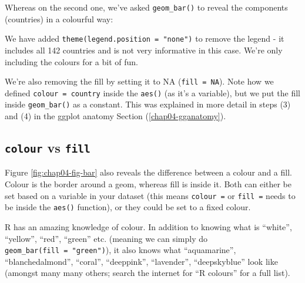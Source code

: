 \documentclass[
  12pt,
  krantz2]{krantz}
\makeatletter
\newenvironment{Shaded}{\begin{snugshade}}{\end{snugshade}}
\newcommand{\DataTypeTok}[1]{\textcolor[rgb]{0.13,0.29,0.53}{#1}}
\newcommand{\KeywordTok}[1]{\textcolor[rgb]{0.13,0.29,0.53}{\textbf{#1}}}
\newcommand{\NormalTok}[1]{#1}
\newcommand{\OperatorTok}[1]{\textcolor[rgb]{0.81,0.36,0.00}{\textbf{#1}}}
\newcommand{\OtherTok}[1]{\textcolor[rgb]{0.56,0.35,0.01}{#1}}
\newcommand{\StringTok}[1]{\textcolor[rgb]{0.31,0.60,0.02}{#1}}
\newenvironment{kframe}{%
\medskip{}
\setlength{\fboxsep}{.8em}
 \def\at@end@of@kframe{}%
 \ifinner\ifhmode%
  \def\at@end@of@kframe{\end{minipage}}%
  \begin{minipage}{\columnwidth}%
 \fi\fi%
 \def\FrameCommand##1{\hskip\@totalleftmargin \hskip-\fboxsep
 \colorbox{shadecolor}{##1}\hskip-\fboxsep
     \hskip-\linewidth \hskip-\@totalleftmargin \hskip\columnwidth}%
 \MakeFramed {\advance\hsize-\width
   \@totalleftmargin\z@ \linewidth\hsize
   \@setminipage}}%
 {\par\unskip\endMakeFramed%
 \at@end@of@kframe}
\renewenvironment{Shaded}{\begin{kframe}}{\end{kframe}}
\makeatother
\begin{document}
Whereas on the second one, we've asked \texttt{geom\_bar()} to reveal the components (countries) in a colourful way:

\begin{Shaded}
\end{Shaded}

We have added \texttt{theme(legend.position\ =\ "none")} to remove the legend - it includes all 142 countries and is not very informative in this case.
We're only including the colours for a bit of fun.

We're also removing the fill by setting it to NA (\texttt{fill\ =\ NA}).
Note how we defined \texttt{colour\ =\ country} inside the \texttt{aes()} (as it's a variable), but we put the fill inside \texttt{geom\_bar()} as a constant.
This was explained in more detail in steps (3) and (4) in the ggplot anatomy Section (\ref{chap04-gganatomy}).

\hypertarget{colour-vs-fill}{%
\subsection{\texorpdfstring{\texttt{colour} vs \texttt{fill}}{colour vs fill}}\label{colour-vs-fill}}


Figure \ref{fig:chap04-fig-bar} also reveals the difference between a colour and a fill.
Colour is the border around a geom, whereas fill is inside it.
Both can either be set based on a variable in your dataset (this means \texttt{colour\ =} or \texttt{fill\ =} needs to be inside the \texttt{aes()} function), or they could be set to a fixed colour.

R has an amazing knowledge of colour.
In addition to knowing what is ``white'', ``yellow'', ``red'', ``green'' etc. (meaning we can simply do \texttt{geom\_bar(fill\ =\ "green")}), it also knows what ``aquamarine'', ``blanchedalmond'', ``coral'', ``deeppink'', ``lavender'', ``deepskyblue'' look like (amongst many many others; search the internet for ``R colours'' for a full list).
\end{document}
